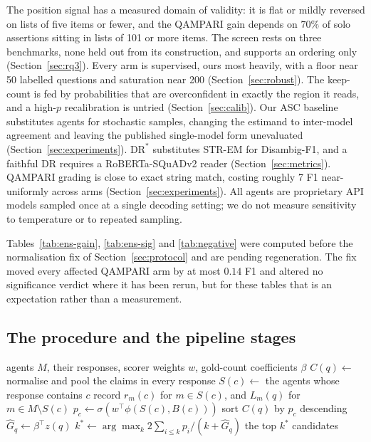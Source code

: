 \documentclass{article}
\begin{document}
The position signal has a measured domain of validity: it is flat or mildly reversed on lists of five items or fewer, and the QAMPARI gain depends on $70\%$ of solo assertions sitting in lists of 101 or more items. The screen rests on three benchmarks, none held out from its construction, and supports an ordering only (Section~\ref{sec:rq3}). Every arm is supervised, ours most heavily, with a floor near 50 labelled questions and saturation near 200 (Section~\ref{sec:robust}). The keep-count is fed by probabilities that are overconfident in exactly the region it reads, and a high-$p$ recalibration is untried (Section~\ref{sec:calib}). Our ASC baseline substitutes agents for stochastic samples, changing the estimand to inter-model agreement and leaving the published single-model form unevaluated (Section~\ref{sec:experiments}). $\mathrm{DR}^*$ substitutes STR-EM for Disambig-F1, and a faithful DR requires a RoBERTa-SQuADv2 reader (Section~\ref{sec:metrics}). QAMPARI grading is close to exact string match, costing roughly 7 F1 near-uniformly across arms (Section~\ref{sec:experiments}). All agents are proprietary API models sampled once at a single decoding setting; we do not measure sensitivity to temperature or to repeated sampling.

Tables~\ref{tab:ens-gain}, \ref{tab:ens-sig} and \ref{tab:negative} were computed before the normalisation fix of Section~\ref{sec:protocol} and are pending regeneration. The fix moved every affected QAMPARI arm by at most $0.14$ F1 and altered no significance verdict where it has been rerun, but for these tables that is an expectation rather than a measurement.

\subsection{The procedure and the pipeline stages}
\label{app:proc}

\begin{algorithm}[t]
\small
\caption{Behavioural aggregation for one question $q$}
\label{alg:ba}
\begin{algorithmic}[1]
\Require agents $M$, their responses, scorer weights $w$, gold-count coefficients $\beta$
\State $C(q) \gets$ normalise and pool the claims in every response
    \State $S(c) \gets$ the agents whose response contains $c$
    \State record $r_m(c)$ for $m \in S(c)$, and $L_m(q)$ for $m \in M \setminus S(c)$
    \State $p_c \gets \sigma\!\left(w^{\top}\phi(S(c), B(c))\right)$ 
\EndFor
\State sort $C(q)$ by $p_c$ descending
\State $\hat{G}_q \gets \beta^{\top} z(q)$ 
\State $k^{*} \gets \arg\max_k 2\sum_{i \leq k} p_i / (k + \hat{G}_q)$ 
\State \Return the top $k^{*}$ candidates
\end{algorithmic}
\end{algorithm}
\end{document}
